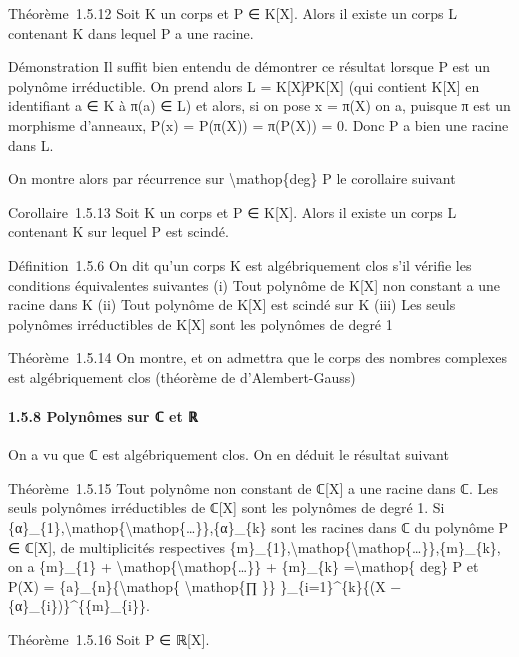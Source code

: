 \documentclass[]{article}
\begin{document}
Théorème~1.5.12 Soit K un corps et P ∈ K{[}X{]}. Alors il existe un
corps L contenant K dans lequel P a une racine.

Démonstration Il suffit bien entendu de démontrer ce résultat lorsque P
est un polynôme irréductible. On prend alors L = K{[}X{]}∕PK{[}X{]} (qui
contient K{[}X{]} en identifiant a ∈ K à π(a) ∈ L) et alors, si on pose
x = π(X) on a, puisque π est un morphisme d'anneaux, P(x) = P(π(X)) =
π(P(X)) = 0. Donc P a bien une racine dans L.

On montre alors par récurrence sur \textbackslash{}mathop\{deg\} P le
corollaire suivant

Corollaire~1.5.13 Soit K un corps et P ∈ K{[}X{]}. Alors il existe un
corps L contenant K sur lequel P est scindé.

Définition~1.5.6 On dit qu'un corps K est algébriquement clos s'il
vérifie les conditions équivalentes suivantes (i) Tout polynôme de
K{[}X{]} non constant a une racine dans K (ii) Tout polynôme de K{[}X{]}
est scindé sur K (iii) Les seuls polynômes irréductibles de K{[}X{]}
sont les polynômes de degré 1

Théorème~1.5.14 On montre, et on admettra que le corps des nombres
complexes est algébriquement clos (théorème de d'Alembert-Gauss)

\paragraph{1.5.8 Polynômes sur ℂ et ℝ}

On a vu que ℂ est algébriquement clos. On en déduit le résultat suivant

Théorème~1.5.15 Tout polynôme non constant de ℂ{[}X{]} a une racine dans
ℂ. Les seuls polynômes irréductibles de ℂ{[}X{]} sont les polynômes de
degré 1. Si
\{α\}\_\{1\},\textbackslash{}mathop\{\textbackslash{}mathop\{\ldots{}\}\},\{α\}\_\{k\}
sont les racines dans ℂ du polynôme P ∈ ℂ{[}X{]}, de multiplicités
respectives
\{m\}\_\{1\},\textbackslash{}mathop\{\textbackslash{}mathop\{\ldots{}\}\},\{m\}\_\{k\},
on a \{m\}\_\{1\} +
\textbackslash{}mathop\{\textbackslash{}mathop\{\ldots{}\}\} +
\{m\}\_\{k\} =\textbackslash{}mathop\{ deg\} P et P(X) =
\{a\}\_\{n\}\{\textbackslash{}mathop\{ \textbackslash{}mathop\{∏ \}\}
\}\_\{i=1\}\^{}\{k\}\{(X − \{α\}\_\{i\})\}\^{}\{\{m\}\_\{i\}\}.

Théorème~1.5.16 Soit P ∈ ℝ{[}X{]}.
\end{document}
